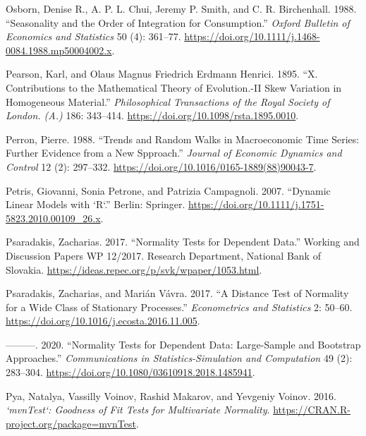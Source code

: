 \begin{CSLReferences}{1}{0}
\leavevmode{}%
Osborn, Denise R., A. P. L. Chui, Jeremy P. Smith, and C. R. Birchenhall. 1988. {``Seasonality and the Order of Integration for Consumption.''} \emph{Oxford Bulletin of Economics and Statistics} 50 (4): 361--77. \url{https://doi.org/10.1111/j.1468-0084.1988.mp50004002.x}.

\leavevmode{}%
Pearson, Karl, and Olaus Magnus Friedrich Erdmann Henrici. 1895. {``X. {C}ontributions to the Mathematical Theory of Evolution.-{II} {S}kew Variation in Homogeneous Material.''} \emph{Philosophical Transactions of the Royal Society of London. (A.)} 186: 343--414. \url{https://doi.org/10.1098/rsta.1895.0010}.

\leavevmode{}%
Perron, Pierre. 1988. {``Trends and Random Walks in Macroeconomic Time Series: Further Evidence from a New Spproach.''} \emph{Journal of Economic Dynamics and Control} 12 (2): 297--332. \url{https://doi.org/10.1016/0165-1889(88)90043-7}.

\leavevmode{}%
Petris, Giovanni, Sonia Petrone, and Patrizia Campagnoli. 2007. {``Dynamic Linear Models with {`R`}.''} Berlin: Springer. \url{https://doi.org/10.1111/j.1751-5823.2010.00109_26.x}.

\leavevmode{}%
Psaradakis, Zacharias. 2017. {``Normality Tests for Dependent Data.''} Working and Discussion Papers WP 12/2017. Research Department, National Bank of Slovakia. \url{https://ideas.repec.org/p/svk/wpaper/1053.html}.

\leavevmode{}%
Psaradakis, Zacharias, and Marián Vávra. 2017. {``A Distance Test of Normality for a Wide Class of Stationary Processes.''} \emph{Econometrics and Statistics} 2: 50--60. \url{https://doi.org/10.1016/j.ecosta.2016.11.005}.

\leavevmode{}%
---------. 2020. {``Normality Tests for Dependent Data: Large-Sample and Bootstrap Approaches.''} \emph{Communications in Statistics-Simulation and Computation} 49 (2): 283--304. \url{https://doi.org/10.1080/03610918.2018.1485941}.

\leavevmode{}%
Pya, Natalya, Vassilly Voinov, Rashid Makarov, and Yevgeniy Voinov. 2016. \emph{`mvnTest`: Goodness of Fit Tests for Multivariate Normality}. \url{https://CRAN.R-project.org/package=mvnTest}.


\end{CSLReferences}
